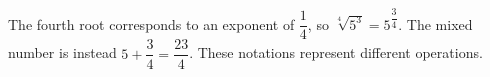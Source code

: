 The fourth root corresponds to an exponent of $\dfrac{1}{4}$, so $\sqrt[4]{5^3}=\boxed{5^{\dfrac{3}{4}}}$. The mixed number is instead $5+\dfrac{3}{4}=\dfrac{23}{4}$. These notations represent different operations.
